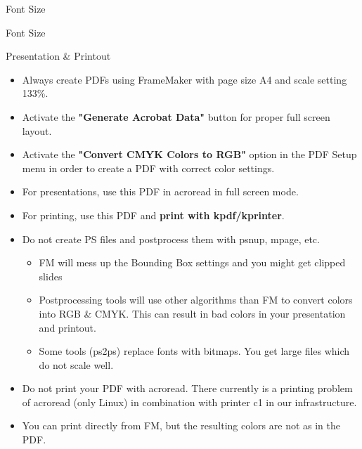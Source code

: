 \documentclass[english,notes]{beamer}
\begin{document}
\begin{frame}{Font Size}
    \testsize{\Large}
\end{frame}

\begin{frame}{Font Size}
    \testsize{\LARGE}
\end{frame}

\makeatletter
\ikr@gridtrue
\makeatother

\begin{frame}{Presentation \& Printout}
\begin{itemize}
\item Always create PDFs using FrameMaker with page size A4 and scale setting 133\%.
\item Activate the \textbf{"Generate Acrobat Data"} button for proper full screen layout.
\item Activate the \textbf{"Convert CMYK Colors to RGB"} option in the PDF Setup menu in order
to create a PDF with correct color settings.
\item For presentations, use this PDF in acroread in full screen mode.
\item For printing, use this PDF and \textbf{print with kpdf/kprinter}.
\end{itemize}

\begin{itemize}
\item Do not create PS files and postprocess them with psnup, mpage, etc.
    \begin{itemize}
    \item FM will mess up the Bounding Box settings and you might get clipped slides
    \item Postprocessing tools will use other algorithms than FM to convert colors into RGB \&
    CMYK. This can result in bad colors in your presentation and printout.
    \item Some tools (ps2ps) replace fonts with bitmaps. You get large files which do not scale well.
    \end{itemize}
\item Do not print your PDF with acroread. There currently is a printing problem of acroread
(only Linux) in combination with printer c1 in our infrastructure.
\item You can print directly from FM, but the resulting colors are not as in the PDF.
\end{itemize}
\end{frame}

\end{document}
